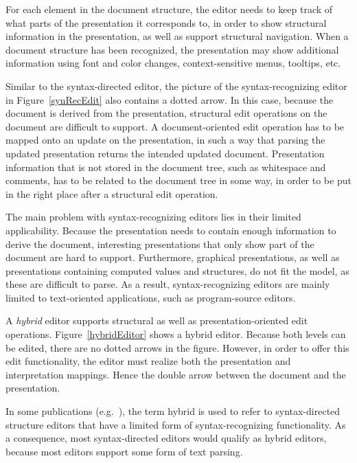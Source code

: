 For each element in the document structure, the editor needs to keep track of what parts of the presentation it corresponds to, in order to show structural information in the presentation, as well as support structural navigation. When a document structure has been recognized, the presentation may show additional information using font and color changes, context-sensitive menus, tooltips, etc.
\finallongpage

Similar to the syntax-directed editor, the picture of the syntax-recognizing editor in Figure~\ref{synRecEdit} also contains a dotted arrow. In this case, because the document is derived from the presentation, structural edit operations on the document are difficult to support. A document-oriented edit operation has to be mapped onto an update on the presentation, in such a way that parsing the updated presentation returns the intended updated document. Presentation information that is not stored in the document tree, such as whitespace and comments, has to be related to the document tree in some way, in order to be put in the right place after a structural edit operation.

The main problem with syntax-recognizing editors lies in their limited applicability. Because the presentation needs to contain enough information to derive the document, interesting presentations that only show part of the document are hard to support. Furthermore, graphical presentations, as well as presentations containing computed values and structures, do not fit the model, as these are difficult to parse. As a result, syntax-recognizing editors are mainly limited to text-oriented applications, such as program-source editors.



A {\em hybrid} editor supports structural as well as presentation-oriented edit operations. Figure~\ref{hybridEditor} shows a hybrid editor. Because both levels can be edited, there are no dotted arrows in the figure. However, in order to offer this edit functionality, the editor must realize both the presentation and interpretation mappings. Hence the double arrow between the document and the presentation. 

In some publications (e.g.~\cite{teitelbaum81progSynth, minor90editing}), the term hybrid is used to refer to syntax-directed structure editors that have a limited form of syntax-recognizing functionality. As a consequence, most syntax-directed editors would qualify as hybrid editors, because most editors support some form of text parsing.

